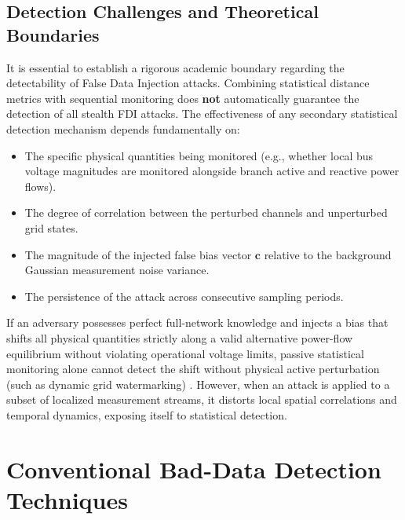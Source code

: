 \documentclass[12pt,a4paper]{report}
\begin{document}
\subsection{Detection Challenges and Theoretical Boundaries}
It is essential to establish a rigorous academic boundary regarding the detectability
of False Data Injection attacks. Combining statistical distance metrics with sequential
monitoring does \textbf{not} automatically guarantee the detection of all stealth FDI attacks.
The effectiveness of any secondary statistical detection mechanism depends fundamentally on:
\begin{itemize}
    \item The specific physical quantities being monitored (e.g., whether local bus voltage
    magnitudes are monitored alongside branch active and reactive power flows).
    \item The degree of correlation between the perturbed channels and unperturbed grid states.
    \item The magnitude of the injected false bias vector $\boldsymbol{c}$ relative to the
    background Gaussian measurement noise variance.
    \item The persistence of the attack across consecutive sampling periods.
\end{itemize}
If an adversary possesses perfect full-network knowledge and injects a bias that shifts
all physical quantities strictly along a valid alternative power-flow equilibrium without
violating operational voltage limits, passive statistical monitoring alone cannot detect
the shift without physical active perturbation (such as dynamic grid watermarking) \cite{wang2023}.
However, when an attack is applied to a subset of localized measurement streams, it
distorts local spatial correlations and temporal dynamics, exposing itself to statistical
detection.

\section{Conventional Bad-Data Detection Techniques}
\end{document}
